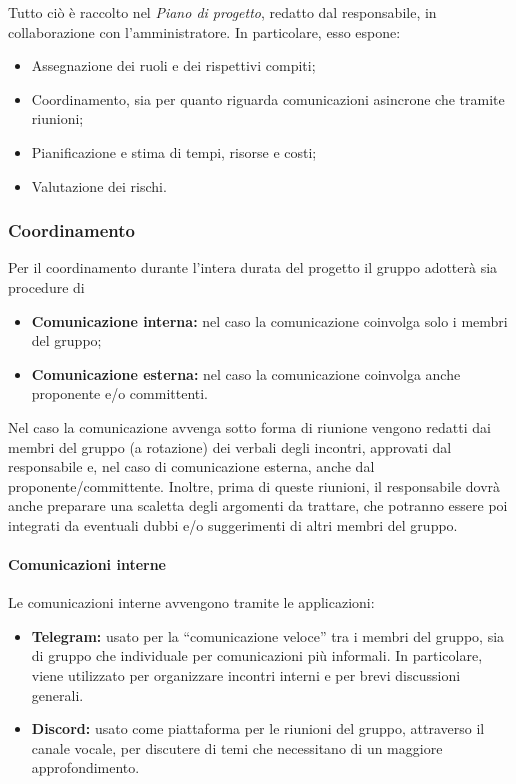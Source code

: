 Tutto ciò è raccolto nel \textit{Piano di progetto},
redatto dal responsabile, in collaborazione con l'amministratore. In particolare, esso espone:
\begin{itemize}
    \item Assegnazione dei ruoli e dei rispettivi compiti;
    \item Coordinamento, sia per quanto riguarda comunicazioni asincrone che tramite riunioni;
    \item Pianificazione e stima di tempi, risorse e costi;
    \item Valutazione dei rischi.
\end{itemize}

\subsubsection{Coordinamento}
Per il coordinamento durante l’intera durata del progetto il gruppo adotterà sia procedure di
\begin{itemize}
    \item \textbf{Comunicazione interna:} nel caso la comunicazione coinvolga solo i membri del gruppo;
    \item \textbf{Comunicazione esterna:} nel caso la comunicazione coinvolga anche proponente e/o committenti.
\end{itemize}
Nel caso la comunicazione avvenga sotto forma di riunione vengono redatti dai membri del gruppo (a rotazione) dei verbali degli incontri, approvati dal responsabile e, nel caso di comunicazione esterna, anche dal proponente/committente. Inoltre, prima di queste riunioni, il responsabile dovrà anche preparare una scaletta degli argomenti da trattare, che potranno essere poi integrati da eventuali dubbi e/o suggerimenti di altri membri del gruppo. 

\paragraph{Comunicazioni interne}
Le comunicazioni interne avvengono tramite le applicazioni:
\begin{itemize}
    \item \textbf{Telegram:} usato per la ``comunicazione veloce'' tra i membri del gruppo, sia di gruppo che individuale per comunicazioni più informali. In particolare, viene utilizzato per organizzare incontri interni e per brevi discussioni generali.
    \item \textbf{Discord:} usato come piattaforma per le riunioni del gruppo, attraverso il canale vocale, per discutere di temi che necessitano di un maggiore approfondimento.
\end{itemize}

